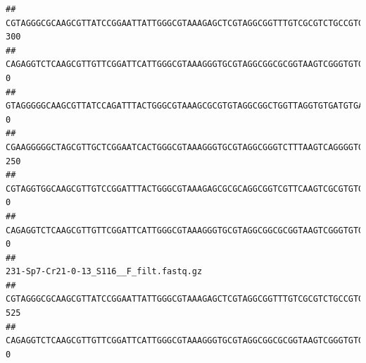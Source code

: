 \documentclass[]{article}
\begin{document}
\begin{verbatim}
## CGTAGGGCGCAAGCGTTATCCGGAATTATTGGGCGTAAAGAGCTCGTAGGCGGTTTGTCGCGTCTGCCGTGAAAGTCCGGGGCTCAACTCCGGATCTGCGGTGGGTACGGGCAGACTAGAGTGATGTAGGGGAGACTGGAATTCCTGGTGTAGCGGTGAAATGCGCAGATATCAGGAGGAACACCGATGGCGAAGGCAGGTCTCTGGGCATTAACTGACGCTGAGGAGCGAAAGCATGGGGAGCGAACA                                     300
## CAGAGGTCTCAAGCGTTGTTCGGATTCATTGGGCGTAAAGGGTGCGTAGGCGGCGCGGTAAGTCGGGTGTGAAATCTCGGAGCTTAACTCCGAAACTGCATTCGATACTGCCGTGCTTGAGGACTGGAGAGGAGACTGGAATTTACGGTGTAGCGGTGAAATGCGTAGATATCGTAAGGAAGACCAGTGGCGAAGGCGGGTCTCTGGACAGTTCCTGACGCTGAGGCACGAAGGCCAGGGGAGCAAACG                                       0
## GTAGGGGGCAAGCGTTATCCAGATTTACTGGGCGTAAAGCGCGTGTAGGCGGCTGGTTAGGTGTGATGTGAAATCTTCCGGCTCAACCGGAAAACTGCATTGCAAACCGGCCTGGCTAGAGTGCAGGAGAGGGAAGCGGAATTCCAGGTGTAGCGGTGAAATGCGTAGATATCTGGAGGAACACCAGTGGCGAAGGCGGCTTCCTGGCCTGCAACTGACGCTGAGACGCGAAAGCGTGGGGAGCGAAC                                        0
## CGAAGGGGGCTAGCGTTGCTCGGAATCACTGGGCGTAAAGGGTGCGTAGGCGGGTCTTTAAGTCAGGGGTGAAATCCTGGAGCTCAACTCCAGAACTGCCTTTGATACTGAAGATCTTGAGTTCGGGAGAGGTGAGTGGAACTGCGAGTGTAGAGGTGAAATTCGTAGATATTCGCAAGAACACCAGTGGCGAAGGCGGCTCACTGGCCCGATACTGACGCTGAGGCACGAAAGCGTGGGGAGCAAACA                                     250
## CGTAGGTGGCAAGCGTTGTCCGGATTTACTGGGCGTAAAGAGCGCGCAGGCGGTCGTTCAAGTCGCGTGTGAAAGCCCCCGGCTCAACTGGGGAGGGTCACGCGATACTGATCGACTCGAAGGCAGGAGAGGGTAGTGGAATTCCCGGTGTAGTGGTGAAATGCGTAGATATCGGGAGGAACACCAGTGGCGAAGGCGACTACCTGGCCTGTTCTTGACGCTGAGGCGCGAAAGCTAGGGGAGCAAACG                                       0
## CAGAGGTCTCAAGCGTTGTTCGGATTCATTGGGCGTAAAGGGTGCGTAGGCGGCGCGGTAAGTCGGGTGTGAAATCTCGGGGCTTAACTCCGAAACTGCATTCGATACTGCCGTGCTTGAGGACTGGAGAGGAGACTGGAATTTACGGTGTAGCGGTGAAATGCGTAGATATCGTAAGGAAGACCAGTGGCGAAGGCGGGTCTCTGGACAGTTCCTGACGCTGAGGCACGAAGGCCAGGGGAGCAAACG                                       0
##                                                                                                                                                                                                                                                           231-Sp7-Cr21-0-13_S116__F_filt.fastq.gz
## CGTAGGGCGCAAGCGTTATCCGGAATTATTGGGCGTAAAGAGCTCGTAGGCGGTTTGTCGCGTCTGCCGTGAAAGTCCGGGGCTCAACTCCGGATCTGCGGTGGGTACGGGCAGACTAGAGTGATGTAGGGGAGACTGGAATTCCTGGTGTAGCGGTGAAATGCGCAGATATCAGGAGGAACACCGATGGCGAAGGCAGGTCTCTGGGCATTAACTGACGCTGAGGAGCGAAAGCATGGGGAGCGAACA                                     525
## CAGAGGTCTCAAGCGTTGTTCGGATTCATTGGGCGTAAAGGGTGCGTAGGCGGCGCGGTAAGTCGGGTGTGAAATCTCGGAGCTTAACTCCGAAACTGCATTCGATACTGCCGTGCTTGAGGACTGGAGAGGAGACTGGAATTTACGGTGTAGCGGTGAAATGCGTAGATATCGTAAGGAAGACCAGTGGCGAAGGCGGGTCTCTGGACAGTTCCTGACGCTGAGGCACGAAGGCCAGGGGAGCAAACG                                       0

\end{verbatim}
\end{document}

